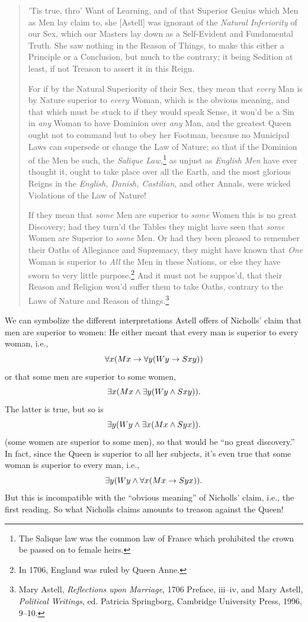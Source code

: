 			\begin{quotation}
				'Tis true, thro' Want of Learning, and of that Superior Genius which
				Men as Men lay claim to, she [Astell] was ignorant of the
				\textit{Natural Inferiority} of our Sex, which our Masters lay down as
				a Self-Evident and Fundamental Truth. She saw nothing in the Reason of
				Things, to make this either a Principle or a Conclusion, but much to
				the contrary; it being Sedition at least, if not Treason to assert it
				in this Reign.
				
				For if by the Natural Superiority of their Sex, they mean that
				\textit{every} Man is by Nature superior to \textit{every} Woman,
				which is the obvious meaning, and that which must be stuck to if they
				would speak Sense, it wou'd be a Sin in \textit{any} Woman to have
				Dominion over \textit{any} Man, and the greatest Queen ought not to
				command but to obey her Footman, because no Municipal Laws can
				supersede or change the Law of Nature; so that if the Dominion of the
				Men be such, the \textit{Salique Law,}\footnote{The Salique law was
					the common law of France which prohibited the crown be passed on to
					female heirs.} as unjust as \textit{English Men} have ever thought
				it, ought to take place over all the Earth, and the most glorious
				Reigns in the \textit{English, Danish, Castilian}, and other Annals,
				were wicked Violations of the Law of Nature!
				
				If they mean that \textit{some} Men are superior to \textit{some}
				Women this is no great Discovery; had they turn'd the Tables they
				might have seen that \textit{some} Women are Superior to \textit{some}
				Men. Or had they been pleased to remember their Oaths of Allegiance
				and Supremacy, they might have known that \textit{One} Woman is
				superior to \textit{All} the Men in these Nations, or else they have
				sworn to very little purpose.\footnote{In 1706, England was ruled by
					Queen Anne.} And it must not be suppos'd, that their Reason and
				Religion wou'd suffer them to take Oaths, contrary to the Laws of
				Nature and Reason of things.\footnote{Mary Astell, \textit{Reflections
						upon Marriage}, 1706 Preface, iii--iv, and Mary Astell,
					\textit{Political Writings}, ed. Patricia Springborg, Cambridge
					University Press, 1996, 9--10.}
			\end{quotation}
			We can symbolize the different interpretations Astell offers of
			Nicholls' claim that men are superior to women:
			He either meant that every man is superior to every woman, i.e.,
			\[
			\forall x(Mx \rightarrow \forall y(Wy \rightarrow Sxy))
			\]
			or that some men are superior to some women,
			\[
			\exists x(Mx \mathbin{\wedge} \exists y(Wy \mathbin{\wedge} Sxy)).
			\]
			The latter is true, but so is
			\[
			\exists y(Wy \mathbin{\wedge} \exists x(Mx \mathbin{\wedge} Syx)).
			\]
			(some women are superior to some men), so that would be ``no great
			discovery.''  In fact, since the Queen is superior to all her
			subjects, it's even true that some woman is superior to every man,
			i.e.,
			\[
			\exists y(Wy \land \forall x(Mx \rightarrow Syx)).
			\]
			But this is incompatible with the ``obvious meaning'' of Nicholls'
			claim, i.e., the first reading. So what Nicholls claims amounts to
			treason against the Queen!
			
